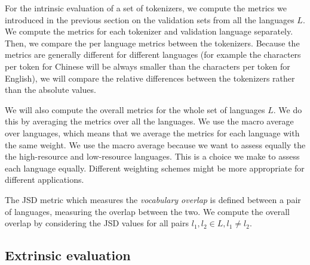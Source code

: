For the intrinsic evaluation of a set of tokenizers, we compute the metrics we introduced in the previous section on the validation sets from all the languages $L$. We compute the metrics for each tokenizer and validation language separately. Then, we compare the per language metrics between the tokenizers. Because the metrics are generally different for different languages (for example the characters per token for Chinese will be always smaller than the characters per token for English), we will compare the relative differences between the tokenizers rather than the absolute values.

We will also compute the overall metrics for the whole set of languages $L$. We do this by averaging the metrics over all the languages. We use the macro average over languages, which means that we average the metrics for each language with the same weight. We use the macro average because we want to assess equally the  the high-resource and low-resource languages. This is a choice we make to assess each language equally. Different weighting schemes might be more appropriate for different applications.

The JSD metric which measures the \textit{vocabulary overlap} is defined between a pair of languages, measuring the overlap between the two. We compute the overall overlap by considering the JSD values for all pairs  $l_1, l_2 \in L, l_1 \neq l_2$.

\subsection{Extrinsic evaluation}


